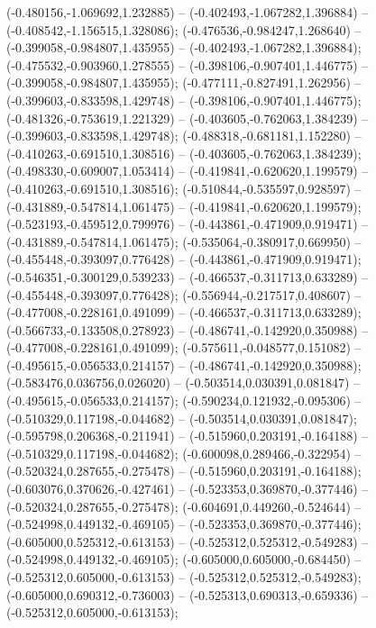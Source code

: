  (-0.480156,-1.069692,1.232885) -- (-0.402493,-1.067282,1.396884) -- (-0.408542,-1.156515,1.328086);
 (-0.476536,-0.984247,1.268640) -- (-0.399058,-0.984807,1.435955) -- (-0.402493,-1.067282,1.396884);
 (-0.475532,-0.903960,1.278555) -- (-0.398106,-0.907401,1.446775) -- (-0.399058,-0.984807,1.435955);
 (-0.477111,-0.827491,1.262956) -- (-0.399603,-0.833598,1.429748) -- (-0.398106,-0.907401,1.446775);
 (-0.481326,-0.753619,1.221329) -- (-0.403605,-0.762063,1.384239) -- (-0.399603,-0.833598,1.429748);
 (-0.488318,-0.681181,1.152280) -- (-0.410263,-0.691510,1.308516) -- (-0.403605,-0.762063,1.384239);
 (-0.498330,-0.609007,1.053414) -- (-0.419841,-0.620620,1.199579) -- (-0.410263,-0.691510,1.308516);
 (-0.510844,-0.535597,0.928597) -- (-0.431889,-0.547814,1.061475) -- (-0.419841,-0.620620,1.199579);
 (-0.523193,-0.459512,0.799976) -- (-0.443861,-0.471909,0.919471) -- (-0.431889,-0.547814,1.061475);
 (-0.535064,-0.380917,0.669950) -- (-0.455448,-0.393097,0.776428) -- (-0.443861,-0.471909,0.919471);
 (-0.546351,-0.300129,0.539233) -- (-0.466537,-0.311713,0.633289) -- (-0.455448,-0.393097,0.776428);
 (-0.556944,-0.217517,0.408607) -- (-0.477008,-0.228161,0.491099) -- (-0.466537,-0.311713,0.633289);
 (-0.566733,-0.133508,0.278923) -- (-0.486741,-0.142920,0.350988) -- (-0.477008,-0.228161,0.491099);
 (-0.575611,-0.048577,0.151082) -- (-0.495615,-0.056533,0.214157) -- (-0.486741,-0.142920,0.350988);
 (-0.583476,0.036756,0.026020) -- (-0.503514,0.030391,0.081847) -- (-0.495615,-0.056533,0.214157);
 (-0.590234,0.121932,-0.095306) -- (-0.510329,0.117198,-0.044682) -- (-0.503514,0.030391,0.081847);
 (-0.595798,0.206368,-0.211941) -- (-0.515960,0.203191,-0.164188) -- (-0.510329,0.117198,-0.044682);
 (-0.600098,0.289466,-0.322954) -- (-0.520324,0.287655,-0.275478) -- (-0.515960,0.203191,-0.164188);
 (-0.603076,0.370626,-0.427461) -- (-0.523353,0.369870,-0.377446) -- (-0.520324,0.287655,-0.275478);
 (-0.604691,0.449260,-0.524644) -- (-0.524998,0.449132,-0.469105) -- (-0.523353,0.369870,-0.377446);
 (-0.605000,0.525312,-0.613153) -- (-0.525312,0.525312,-0.549283) -- (-0.524998,0.449132,-0.469105);
 (-0.605000,0.605000,-0.684450) -- (-0.525312,0.605000,-0.613153) -- (-0.525312,0.525312,-0.549283);
 (-0.605000,0.690312,-0.736003) -- (-0.525313,0.690313,-0.659336) -- (-0.525312,0.605000,-0.613153);
